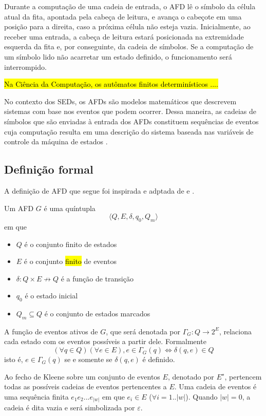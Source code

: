 Durante a computação de uma cadeia de entrada, o AFD lê o símbolo da célula atual da fita, apontada pela cabeça de leitura, e avança o cabeçote em uma posição para a direita, caso a próxima célula não esteja vazia. Inicialmente, ao receber uma entrada, a cabeça de leitura estará posicionada na extremidade esquerda da fita e, por conseguinte, da cadeia de símbolos. Se a computação de um símbolo lido não acarretar um estado definido, o funcionamento será interrompido.

\hl{Na Ciência da Computação, os autômatos finitos determinísticos ....}

No contexto dos \acs{SED}s, os AFDs são modelos matemáticos que descrevem sistemas com base nos eventos que podem ocorrer. Dessa maneira, as cadeias de símbolos que são enviadas à entrada dos AFDs constituem sequências de eventos cuja computação resulta em uma descrição do sistema baseada nas variáveis de controle da máquina de estados \cite{cassandras}.

\subsection{Definição formal}

A definição de \acs{AFD} que segue foi inspirada e adptada de  e .

Um AFD $G$ é uma quíntupla $$\langle Q, E, \delta, q_0, Q_m \rangle$$ em que \begin{itemize}[label={}]
  \item $Q$ é o conjunto finito de estados
  \item $E$ é o conjunto \hl{finito} de eventos %
  \item $\delta:Q \times E \nrightarrow Q$ é a função de transição
  \item $q_0 $ é o estado inicial
  \item $Q_m \subseteq Q$ é o conjunto de estados marcados
\end{itemize}

A função de eventos ativos de $G$, que será denotada por $\Gamma_G:Q \rightarrow 2^E$, relaciona cada estado com os eventos possíveis a partir dele. Formalmente $$(\forall q \in Q) (\forall e \in E), e \in \Gamma_G(q) \Leftrightarrow \delta(q, e) \in Q$$ isto é, $e \in \Gamma_G(q)$ se e somente se $\delta(q, e)$ é definido.

Ao fecho de Kleene sobre um conjunto de eventos $E$, denotado por $E^\star$, pertencem todas as possíveis cadeias de eventos pertencentes a $E$. Uma cadeia de eventos é uma sequência finita $e_1 e_2 ... e_{|w|}$ em que $e_i \in E$ ($\forall i = 1..|w|$). Quando $|w| = 0$, a cadeia é dita vazia e será simbolizada por $\varepsilon$.

